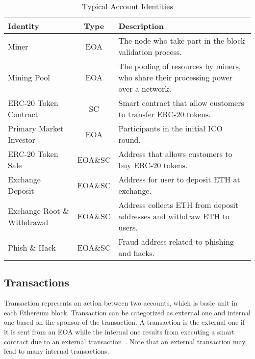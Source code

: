 \begin{table}[htbp]
\caption{Typical Account Identities}
\begin{center}
\begin{tabular}{|p{1.8cm}|c|p{3.9cm}|}
\hline
\textbf{Identity} & \textbf{Type}& \textbf{Description} \\
\hline
Miner & EOA & The node who take part in the block validation process. \\ \hline
Mining Pool & EOA & The pooling of resources by miners, who share their processing power over a network.\\ \hline
ERC-20 Token Contract & SC & Smart contract that allow customers to transfer ERC-20 tokens. \\ \hline
Primary Market Investor & EOA & Participants in the initial ICO round. \\ \hline
ERC-20 Token Sale & EOA\&SC & Address that allows customers to buy ERC-20 tokens. \\ \hline
Exchange Deposit & EOA\&SC & Address for user to deposit ETH at exchange. \\ \hline
Exchange Root \& Withdrawal & EOA\&SC & Address collects ETH from deposit addresses and withdraw ETH to users. \\ \hline
Phish \& Hack & EOA\&SC & Fraud address related to phishing and hacks. \\ \hline
\end{tabular}
\label{tab1}
\end{center}
\end{table}






\subsection{Transactions}
Transaction represents an action between two accounts, which is basic unit in each Ethereum block. Transaction can be categorized as external one and internal one based on the sponsor of the transaction. A transaction is the external one if it is sent from an EOA while the internal one results from executing a smart contract due to an external transaction~\cite{chen2018infocom}. Note that an external transaction may lead to many internal transactions.

